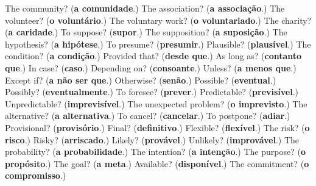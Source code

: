 \begin{tcolorbox}[breakable,colback=teal!4,colframe=teal!35!black,title={Before you move on}]
The community? (\textbf{a comunidade}.) The association? (\textbf{a associação}.) The volunteer? (\textbf{o voluntário}.) The voluntary work? (\textbf{o voluntariado}.) The charity? (\textbf{a caridade}.) To suppose? (\textbf{supor}.) The supposition? (\textbf{a suposição}.) The hypothesis? (\textbf{a hipótese}.) To presume? (\textbf{presumir}.) Plausible? (\textbf{plausível}.) The condition? (\textbf{a condição}.) Provided that? (\textbf{desde que}.) As long as? (\textbf{contanto que}.) In case? (\textbf{caso}.) Depending on? (\textbf{consoante}.) Unless? (\textbf{a menos que}.) Except if? (\textbf{a não ser que}.) Otherwise? (\textbf{senão}.) Possible? (\textbf{eventual}.) Possibly? (\textbf{eventualmente}.) To foresee? (\textbf{prever}.) Predictable? (\textbf{previsível}.) Unpredictable? (\textbf{imprevisível}.) The unexpected problem? (\textbf{o imprevisto}.) The alternative? (\textbf{a alternativa}.) To cancel? (\textbf{cancelar}.) To postpone? (\textbf{adiar}.) Provisional? (\textbf{provisório}.) Final? (\textbf{definitivo}.) Flexible? (\textbf{flexível}.) The risk? (\textbf{o risco}.) Risky? (\textbf{arriscado}.) Likely? (\textbf{provável}.) Unlikely? (\textbf{improvável}.) The probability? (\textbf{a probabilidade}.) The intention? (\textbf{a intenção}.) The purpose? (\textbf{o propósito}.) The goal? (\textbf{a meta}.) Available? (\textbf{disponível}.) The commitment? (\textbf{o compromisso}.)
\end{tcolorbox}
